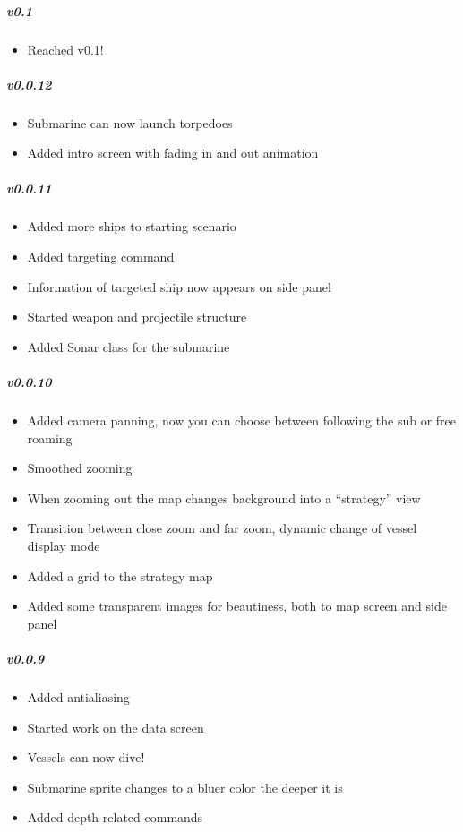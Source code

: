 \subparagraph{v0.1}

\begin{itemize}[noitemsep]
\item
  Reached v0.1!
\end{itemize}

\subparagraph{v0.0.12}

\begin{itemize}[noitemsep]
\item
  Submarine can now launch torpedoes
\item
  Added intro screen with fading in and out animation
\end{itemize}

\subparagraph{v0.0.11}

\begin{itemize}[noitemsep]
\item
  Added more ships to starting scenario
\item
  Added targeting command
\item
  Information of targeted ship now appears on side panel
\item
  Started weapon and projectile structure
\item
  Added Sonar class for the submarine
\end{itemize}

\subparagraph{v0.0.10}

\begin{itemize}[noitemsep]
\item
  Added camera panning, now you can choose between following the sub or
  free roaming
\item
  Smoothed zooming
\item
  When zooming out the map changes background into a ``strategy'' view
\item
  Transition between close zoom and far zoom, dynamic change of vessel
  display mode
\item
  Added a grid to the strategy map
\item
  Added some transparent images for beautiness, both to map screen and
  side panel
\end{itemize}

\subparagraph{v0.0.9}

\begin{itemize}[noitemsep]
\item
  Added antialiasing
\item
  Started work on the data screen
\item
  Vessels can now dive!
\item
  Submarine sprite changes to a bluer color the deeper it is
\item
  Added depth related commands
\end{itemize}


